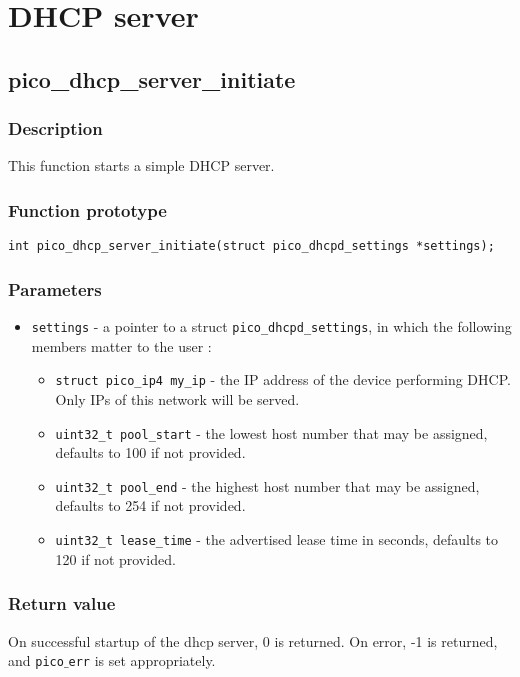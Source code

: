 \section{DHCP server}



\subsection{pico\_dhcp\_server\_initiate}

\subsubsection*{Description}
This function starts a simple DHCP server. 

\subsubsection*{Function prototype}
\texttt{int pico\_dhcp\_server\_initiate(struct pico\_dhcpd\_settings *settings);}

\subsubsection*{Parameters}
\begin{itemize}[noitemsep]
\item \texttt{settings} - a pointer to a struct \texttt{pico\_dhcpd\_settings}, in which the following members matter to the user : 
\begin{itemize}[noitemsep]
\item \texttt{struct pico\_ip4 my\_ip} - the IP address of the device performing DHCP. Only IPs of this network will be served.
\item \texttt{uint32\_t pool\_start} - the lowest host number that may be assigned, defaults to 100 if not provided.
\item \texttt{uint32\_t pool\_end} - the highest host number that may be assigned, defaults to 254 if not provided.
\item \texttt{uint32\_t lease\_time} - the advertised lease time in seconds, defaults to 120 if not provided.
\end{itemize}
\end{itemize}

\subsubsection*{Return value}
On successful startup of the dhcp server, 0 is returned.
On error, -1 is returned, and \texttt{pico$\_$err} is set appropriately.

